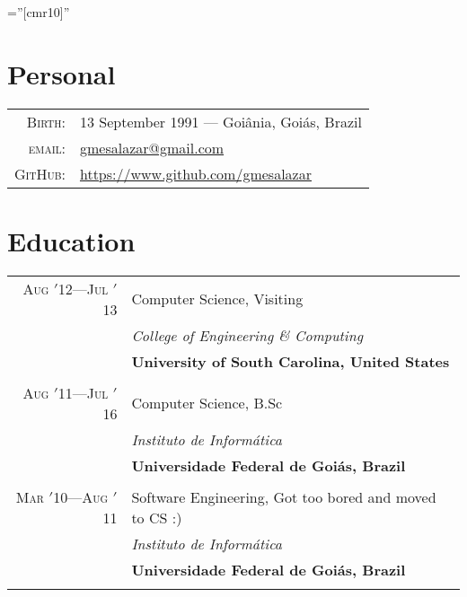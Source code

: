 \documentclass[a4paper,10pt]{article}
\begin{document}
\font\fb=''[cmr10]''

\par{\bigskip\par\vspace{8ex}}

\section{Personal}

\begin{tabular}{r p{3.5in}}
  \textsc{Birth:} & 13 September 1991 \hspace{0.5em}---\hspace{0.5em} Goiânia, Goiás, Brazil\\
  \textsc{email:}     & \href{mailto:gmesalazar@gmail.com}{gmesalazar@gmail.com} \\
  \textsc{GitHub:} & \href{https://www.github.com/gmesalazar/}
  					{https://www.github.com/gmesalazar}\\
\end{tabular}

\section{Education}
\begin{tabular}{r|p{11cm}}

  \textsc{Aug $'$12---Jul $'$13} & Computer Science, Visiting\\ &
  \emph{College of Engineering \& Computing}\\ &
  \textbf{University of South Carolina, United States}
  \\\multicolumn{2}{c}{} \\

  \textsc{Aug $'$11---Jul $'$16} & Computer Science, B.Sc\\ &
  \emph{Instituto de Informática}\\ &
  \textbf{Universidade Federal de Goiás, Brazil}
  \\\multicolumn{2}{c}{} \\

  \textsc{Mar $'$10---Aug $'$11} & Software Engineering, Got too bored and moved to CS :)\\ &
  \emph{Instituto de Informática}\\ &
  \textbf{Universidade Federal de Goiás, Brazil}
  \\\multicolumn{2}{c}{} \\

\end{tabular}
\end{document}
